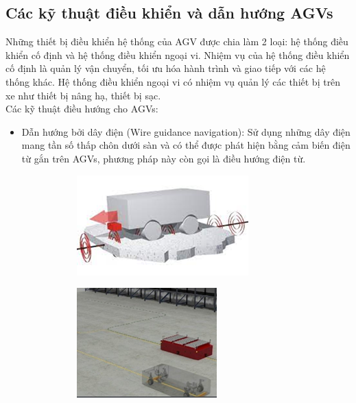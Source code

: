     \subsection{Các kỹ thuật điều khiển và dẫn hướng AGVs}
    \hspace*{0.6cm}Những thiết bị điều khiển hệ thống của AGV được chia làm 2 loại: hệ thống điều khiển cố định và hệ thống điều khiển ngoại vi. 
    Nhiệm vụ của hệ thống điều khiển cố định là quản lý vận chuyển, tối ưu hóa hành trình và giao tiếp với các hệ thống khác. Hệ thống điều khiển
    ngoại vi có nhiệm vụ quản lý các thiết bị trên xe như thiết bị nâng hạ, thiết bị sạc. \\
    \hspace*{0.6cm} Các kỹ thuật điều hướng cho AGVs:
    \begin{itemize}
        \item Dẫn hướng bởi dây điện (Wire guidance navigation): Sử dụng những dây điện mang tần số thấp chôn dưới sàn và có thể được phát 
        hiện bằng cảm biến điện từ gắn trên AGVs, phương pháp này còn gọi là điều hướng điện từ.
            \begin{figure}[H]
                \begin{subfigure}{0.5\textwidth}
                \centering
                \includegraphics[width=0.6\linewidth, right]{pictures/chapter1/chapter1_pic_5a.png} 
                \label{chap1_pic5a}
                \end{subfigure}
                \begin{subfigure}{0.5\textwidth}
                \includegraphics[width=0.5\linewidth]{pictures/chapter1/chapter1_pic_5b.png}

\end{subfigure}
\end{figure}
\end{itemize}
